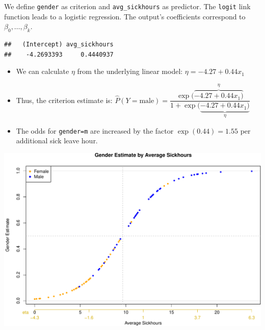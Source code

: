 \documentclass[
  ignorenonframetext,
]{beamer}
\newenvironment{Shaded}{\begin{snugshade}}{\end{snugshade}}
\newcommand{\DataTypeTok}[1]{\textcolor[rgb]{0.13,0.29,0.53}{#1}}
\newcommand{\KeywordTok}[1]{\textcolor[rgb]{0.13,0.29,0.53}{\textbf{#1}}}
\newcommand{\NormalTok}[1]{#1}
\newcommand{\OperatorTok}[1]{\textcolor[rgb]{0.81,0.36,0.00}{\textbf{#1}}}
\newcommand{\StringTok}[1]{\textcolor[rgb]{0.31,0.60,0.02}{#1}}
\providecommand{\tightlist}{%
  \setlength{\itemsep}{0pt}\setlength{\parskip}{0pt}}
\begin{document}
\begin{frame}[fragile]

We define \texttt{gender} as criterion and \texttt{avg\_sickhours} as
predictor. The \texttt{logit} link function leads to a logistic
regression. The output's coefficients correspond to
\(\beta_0,\ldots,\beta_k\).

\tiny

\begin{Shaded}
\end{Shaded}

\begin{verbatim}
##   (Intercept) avg_sickhours 
##    -4.2693393     0.4440937
\end{verbatim}

\normalsize
\tiny\normalsize

\begin{itemize}
\tightlist
\item
  We can calculate \(\eta\) from the underlying linear model:
  \(\eta= -4.27 + 0.44 x_1\)
\item
  Thus, the criterion estimate is:
  \(\hat{P}(Y=\text{male})=\dfrac{\exp(\overbrace{-4.27 + 0.44 x_1)}^{\eta}}{1+\exp(\underbrace{-4.27 + 0.44 x_1)}_{\eta}}\)
\item
  The odds for \texttt{gender=m} are increased by the factor
  \(\exp(0.44)=1.55\) per additional sick leave hour.
\end{itemize}

\end{frame}

\begin{frame}

\tiny\includegraphics{Schmitt_Marvin_binary_response_files/figure-beamer/TOY_LOG_PLOT-1.pdf}
\normalsize

\end{frame}
\end{document}
